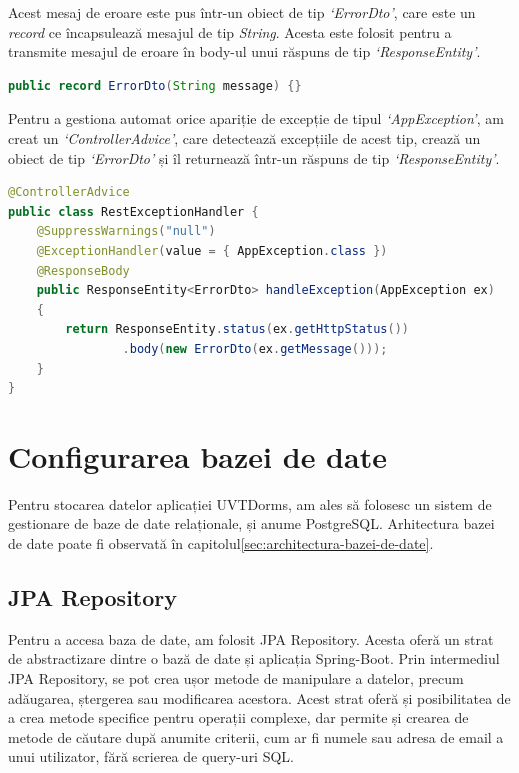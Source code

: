 \documentclass[12pt,a4paper]{report}
\theoremstyle{definition}
\theoremstyle{remark}
\begin{document}
\par Acest mesaj de eroare este pus într-un obiect de tip \textit{`ErrorDto'}, care este un \textit{record}\cite{baeldung_java_vs_final_class} ce încapsulează mesajul de tip \textit{String}. Acesta este folosit pentru a transmite mesajul de eroare în body-ul unui răspuns de tip \textit{`ResponseEntity'}.

\begin{lstlisting}[language=Java, caption={Record pentru mesaje de eroare}]
public record ErrorDto(String message) {}
\end{lstlisting}

\par Pentru a gestiona automat orice apariție de excepție de tipul \textit{`AppException'}, am creat un \textit{`ControllerAdvice'}, care detectează excepțiile de acest tip, crează un obiect de tip \textit{`ErrorDto'} și îl returnează într-un răspuns de tip \textit{`ResponseEntity'}.

\begin{lstlisting}[language=Java, caption={Clasă care gestionează excepțiile apărute}]
@ControllerAdvice
public class RestExceptionHandler {
    @SuppressWarnings("null")
    @ExceptionHandler(value = { AppException.class })
    @ResponseBody
    public ResponseEntity<ErrorDto> handleException(AppException ex)
    {
        return ResponseEntity.status(ex.getHttpStatus())
                .body(new ErrorDto(ex.getMessage()));
    }
}
\end{lstlisting}

\section{Configurarea bazei de date}

\par Pentru stocarea datelor aplicației UVTDorms, am ales să folosesc un sistem de gestionare de baze de date relaționale, și anume PostgreSQL\cite{drake2002practical}. Arhitectura bazei de date poate fi observată în capitolul\ref{sec:architectura-bazei-de-date}.

\subsection{JPA Repository}

\par Pentru a accesa baza de date, am folosit JPA Repository\cite{gierke2012spring}. Acesta oferă un strat de abstractizare dintre o bază de date și aplicația Spring-Boot. Prin intermediul JPA Repository, se pot crea ușor metode de manipulare a datelor, precum adăugarea, ștergerea sau modificarea acestora. Acest strat oferă și posibilitatea de a crea metode specifice pentru operații complexe, dar permite și crearea de metode de căutare după anumite criterii, cum ar fi numele sau adresa de email a unui utilizator, fără scrierea de query-uri SQL\@.
\end{document}
